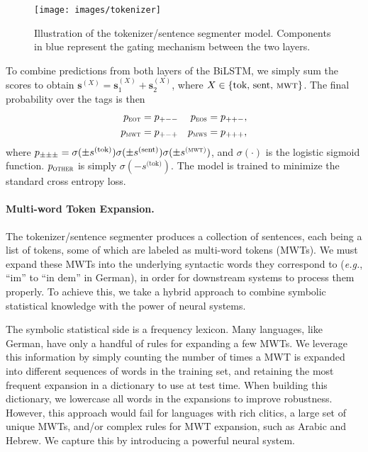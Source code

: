 \documentclass[11pt,a4paper]{article}
\begin{document}
\begin{figure}
  \centering
  \texttt{[image: images/tokenizer]}
  \vspace{-1em}
  \caption{Illustration of the tokenizer\slash{}sentence segmenter model. Components in blue represent the gating mechanism between the two layers.} \label{fig:tokenizer}
\end{figure}

To combine predictions from both layers of the BiLSTM, we simply sum the scores to obtain $\mathbf{s}^{(X)}=\mathbf{s}^{(X)}_1+\mathbf{s}^{(X)}_2$,
where $X\in \{\text{tok, sent, \textsc{mwt}}\}$.
The final probability over the tags is then
\begin{align}
p_{\textsc{eot}} &= p_{+--} & p_{\textsc{eos}} &= p_{++-}, \\
p_{\textsc{mwt}} &= p_{+-+} & p_{\textsc{mws}} &= p_{+++},
\end{align}
where $p_{\pm\pm\pm}=\sigma(\pm s^{\text{(tok)}})\sigma(\pm s^{\text{(sent)}})\sigma(\pm s^{\textsc{(mwt)}})$, and $\sigma(\cdot)$ is the logistic sigmoid function.
$p_{\textsc{other}}$ is simply $\sigma(-s^{\text{(tok)}})$.
The model is trained to minimize the standard cross entropy loss.

\paragraph{Multi-word Token Expansion.} The tokenizer\slash{}sentence segmenter produces a collection of sentences, each being a list of tokens, some of which are labeled as multi-word tokens (MWTs).
We must expand these MWTs into the underlying syntactic words they correspond to (\emph{e.g.}, ``im'' to ``in dem'' in German), in order for downstream systems to process them properly.
To achieve this, we take a hybrid approach to combine symbolic statistical knowledge with the power of neural systems.

The symbolic statistical side is a frequency lexicon. Many languages, like German, have only a handful of rules for expanding a few MWTs.
We leverage this information by simply counting the number of times a MWT is expanded into different sequences of words in the training set, and retaining the most frequent expansion in a dictionary to use at test time.
When building this dictionary, we lowercase all words in the expansions to improve robustness.
However, this approach would fail for languages with rich clitics, a large set of unique MWTs, and/or complex rules for MWT expansion, such as Arabic and Hebrew. We capture this by introducing a powerful neural system.
\end{document}
